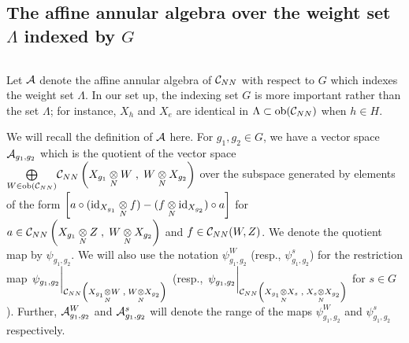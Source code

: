 \subsection{The  affine annular algebra over the weight set $ \Lambda $ indexed by $ G $}{$  $}

Let $ \mathcal A $ denote the affine annular algebra of $ \mathcal C_{NN} $ with respect to $ G $ which indexes the weight set $ \Lambda $.
In our set up, the indexing set $ G $ is more important rather than the set $ \Lambda $; for instance, $ X_h $ and $ X_e $ are identical in $ \Lambda \subset \text{ob} (\mathcal C_{NN}) $ when $ h\in H $.

We will recall the definition of $ \mathcal A $ here.
For $ g_1,g_2 \in G $, we have a vector space $ \mathcal A_{g_1,g_2}$ which is the quotient of the vector space $\underset{W\in \text{ob} (\mathcal C_{NN})}{\bigoplus}  \mathcal C_{NN} \left(X_{g_1} \underset{N}{\otimes} W \; , \; W \underset{N}{\otimes} X_{g_2} \right)$ over the subspace generated by elements of the form $ \left[a \circ (\text{id}_{X_{g_1}} \underset{N}{\otimes} f ) -  (f \underset{N}{\otimes} \text{id}_{X_{g_2}}  ) \circ a \right]$ for $ a \in \mathcal C_{NN} \left(X_{g_1} \underset{N}{\otimes} Z \; , \; W \underset{N}{\otimes} X_{g_2} \right)$ and $ f \in \mathcal C_{NN} (W,Z) $.
We denote the quotient map by $ \psi_{g_1 , g_2} $. We will also use the notation $ \psi^W_{g_1,g_2} $ (resp., $ \psi^s_{g_1,g_2} $) for the restriction map $ \left. \underset{}{\psi_{g_1,g_2}} \right|_{\mathcal C_{NN} \left(X_{g_1} \underset{N}{\otimes} W \; , \; W \underset{N}{\otimes} X_{g_2} \right)} $ (resp., $ \left. \underset{}{\psi_{g_1,g_2}} \right|_{\mathcal C_{NN} \left(X_{g_1} \underset{N}{\otimes} X_s \; , \; X_s \underset{N}{\otimes} X_{g_2} \right)} $ for $ s\in G $).
Further, $ \mathcal A^W_{g_1,g_2} $ and $ \mathcal A^s_{g_1,g_2} $ will denote the range of the maps $ \psi^W_{g_1,g_2} $ and $ \psi^s_{g_1,g_2} $ respectively.

